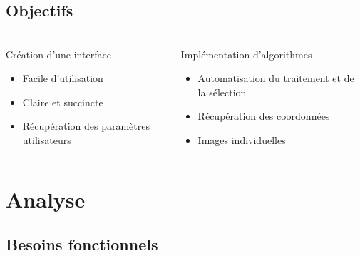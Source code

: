 \documentclass[11pt]{beamer}
\begin{document}
\subsection{Objectifs}
\begin{frame}
\frametitle{\subsecname}
	\begin{columns}[t]
		
		\begin{column}{4.5cm}
			\begin{block}{Création d'une interface}
				\begin{itemize}
					\item Facile d'utilisation
					\item Claire et succincte
					\item Récupération des paramètres utilisateurs
				\end{itemize}
			\end{block}
		\end{column}
		\begin{column}{6.5cm}
		    \begin{block}{Implémentation d'algorithmes}
				\begin{itemize}
					\item Automatisation du traitement et de la sélection
					\item Récupération des coordonnées
					\item Images individuelles
				\end{itemize}
			\end{block}
		\end{column}
	\end{columns}
\end{frame}

\section{Analyse}

\subsection{Besoins fonctionnels}
\end{document}
